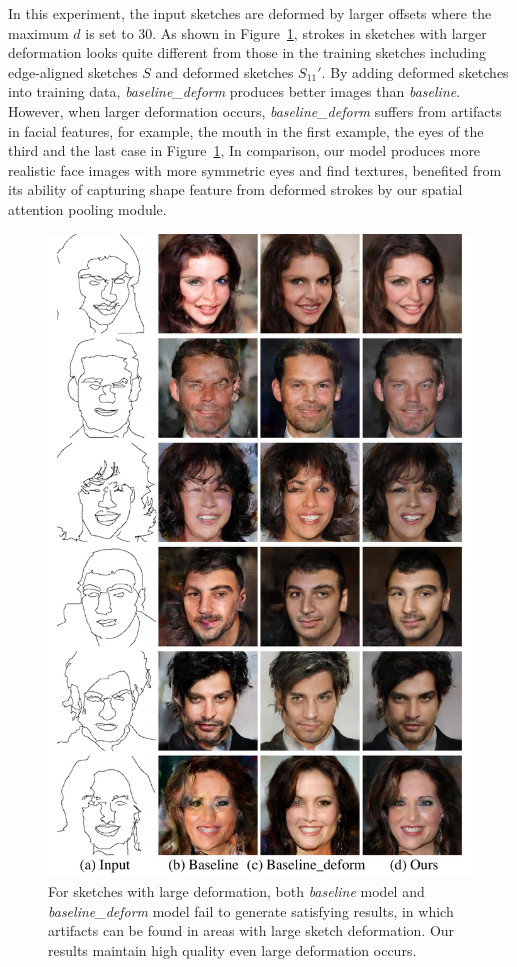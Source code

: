 In this experiment, the input sketches are deformed by larger offsets where the maximum $d$ is set to $30$. 
As shown in Figure~\ref{fig:generalization_examples}, strokes in sketches with larger deformation looks quite different from those in the training sketches including edge-aligned sketches $S$ and deformed sketches $S_{11}'$. 
%
By adding deformed sketches into training data, \textit{baseline\_deform} produces better images than \textit{baseline}. However, when larger deformation occurs, \textit{baseline\_deform} suffers from artifacts in facial features, for example, the mouth in the first example, the eyes of the third and the last case in Figure~\ref{fig:generalization_examples}, 
In comparison, our model produces more realistic face images with more symmetric eyes and find textures, benefited from its ability of capturing shape feature from deformed strokes by our spatial attention pooling module. 
\begin{figure}
	\includegraphics[width=0.9\linewidth]{figs/generalization_examples}
	\caption{For sketches with large deformation, both \textit{baseline} model and \textit{baseline_deform} model fail to generate satisfying results, in which artifacts can be found in areas with large sketch deformation. Our results maintain high quality even large deformation occurs.  }
	\label{fig:generalization_examples}
\end{figure}

